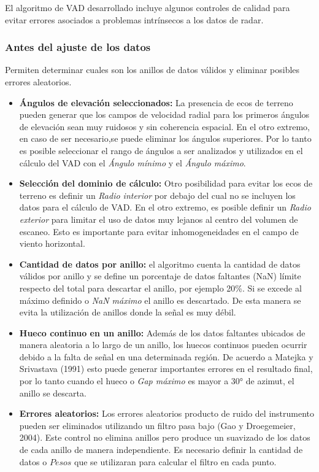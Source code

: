 \documentclass[12pt,spanish,oneside]{book}
\providecommand{\tightlist}{%
  \setlength{\itemsep}{0pt}\setlength{\parskip}{0pt}}
\begin{document}
El algoritmo de VAD desarrollado incluye algunos controles de calidad
para evitar errores asociados a problemas intrínsecos a los datos de
radar.

\subsubsection{Antes del ajuste de los
datos}\label{antes-del-ajuste-de-los-datos}

Permiten determinar cuales son los anillos de datos válidos y eliminar
posibles errores aleatorios.

\begin{itemize}
\tightlist
\item
  \textbf{Ángulos de elevación seleccionados:} La presencia de ecos de
  terreno pueden generar que los campos de velocidad radial para los
  primeros ángulos de elevación sean muy ruidosos y sin coherencia
  espacial. En el otro extremo, en caso de ser necesario,se puede
  eliminar los ángulos superiores. Por lo tanto es posible seleccionar
  el rango de ángulos a ser analizados y utilizados en el cálculo del
  VAD con el \emph{Ángulo mínimo} y el \emph{Ángulo máximo}.
\item
  \textbf{Selección del dominio de cálculo:} Otro posibilidad para
  evitar los ecos de terreno es definir un \emph{Radio interior} por
  debajo del cual no se incluyen los datos para el cálculo de VAD. En el
  otro extremo, es posible definir un \emph{Radio exterior} para limitar
  el uso de datos muy lejanos al centro del volumen de escaneo. Esto es
  importante para evitar inhomogeneidades en el campo de viento
  horizontal.
\item
  \textbf{Cantidad de datos por anillo:} el algoritmo cuenta la cantidad
  de datos válidos por anillo y se define un porcentaje de datos
  faltantes (NaN) límite respecto del total para descartar el anillo,
  por ejemplo 20\%. Si se excede al máximo definido o \emph{NaN máximo}
  el anillo es descartado. De esta manera se evita la utilización de
  anillos donde la señal es muy débil.
\item
  \textbf{Hueco continuo en un anillo:} Además de los datos faltantes
  ubicados de manera aleatoria a lo largo de un anillo, los huecos
  continuos pueden ocurrir debido a la falta de señal en una determinada
  región. De acuerdo a Matejka y Srivastava (1991) esto puede generar
  importantes errores en el resultado final, por lo tanto cuando el
  hueco o \emph{Gap máximo} es mayor a 30° de azimut, el anillo se
  descarta.
\item
  \textbf{Errores aleatorios:} Los errores aleatorios producto de ruido
  del instrumento pueden ser eliminados utilizando un filtro pasa bajo
  (Gao y Droegemeier, 2004). Este control no elimina anillos pero
  produce un suavizado de los datos de cada anillo de manera
  independiente. Es necesario definir la cantidad de datos o \(Pesos\)
  que se utilizaran para calcular el filtro en cada punto.
\end{itemize}
\end{document}
